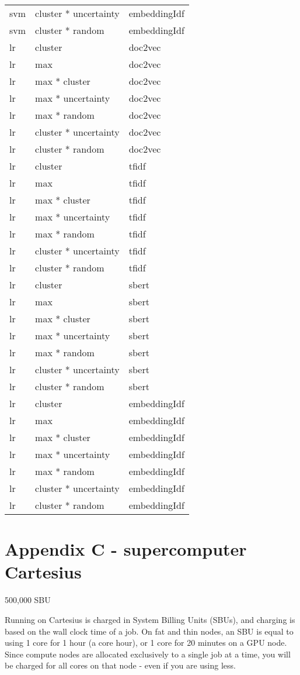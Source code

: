 \documentclass[
]{article}
\begin{document}
\begin{longtable}{lll}
svm & cluster * uncertainty & embeddingIdf\\
\addlinespace
svm & cluster * random & embeddingIdf\\
lr & cluster & doc2vec\\
lr & max & doc2vec\\
lr & max * cluster & doc2vec\\
lr & max * uncertainty & doc2vec\\
\addlinespace
lr & max * random & doc2vec\\
lr & cluster * uncertainty & doc2vec\\
lr & cluster * random & doc2vec\\
lr & cluster & tfidf\\
lr & max & tfidf\\
\addlinespace
lr & max * cluster & tfidf\\
lr & max * uncertainty & tfidf\\
lr & max * random & tfidf\\
lr & cluster * uncertainty & tfidf\\
lr & cluster * random & tfidf\\
\addlinespace
lr & cluster & sbert\\
lr & max & sbert\\
lr & max * cluster & sbert\\
lr & max * uncertainty & sbert\\
lr & max * random & sbert\\
\addlinespace
lr & cluster * uncertainty & sbert\\
lr & cluster * random & sbert\\
lr & cluster & embeddingIdf\\
lr & max & embeddingIdf\\
lr & max * cluster & embeddingIdf\\
\addlinespace
lr & max * uncertainty & embeddingIdf\\
lr & max * random & embeddingIdf\\
lr & cluster * uncertainty & embeddingIdf\\
lr & cluster * random & embeddingIdf\\*
\end{longtable}

\hypertarget{appendix-c---supercomputer-cartesius}{%
\section{Appendix C - supercomputer
Cartesius}\label{appendix-c---supercomputer-cartesius}}

500,000 SBU

Running on Cartesius is charged in System Billing Units (SBUs), and
charging is based on the wall clock time of a job. On fat and thin
nodes, an SBU is equal to using 1 core for 1 hour (a core hour), or 1
core for 20 minutes on a GPU node. Since compute nodes are allocated
exclusively to a single job at a time, you will be charged for all cores
on that node - even if you are using less.

\printbibliography[title=References]
\end{document}
